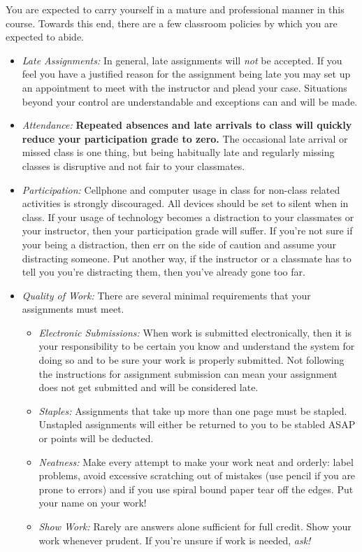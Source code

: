 \documentclass[10pt]{article}
\begin{document}
You are expected to carry yourself in a mature and professional manner in this course. Towards this end, there are a few classroom policies by which you are expected to abide.
\begin{itemize}

\item \textit{Late Assignments: } In general, late assignments will \textit{not} be accepted.  If you feel you have a justified reason for the assignment being late you may set up an appointment to meet with the instructor and plead your case.  Situations beyond your control are understandable and exceptions can and will be made.

\item \textit{Attendance: } \textbf{Repeated absences and late arrivals to class will quickly reduce your participation grade to zero.}  The occasional late arrival or missed class is one thing, but being habitually late and regularly missing classes is disruptive and not fair to your classmates.

\item \textit{Participation: }  Cellphone and computer usage in class for non-class related activities is strongly discouraged.  All devices should be set to silent when in class.  If your usage of technology becomes a distraction to your classmates or your instructor, then your participation grade will suffer.  If you're not sure if your being a distraction, then err on the side of caution and assume your distracting someone.  Put another way, if the instructor or a classmate has to tell you you're distracting them, then you've already gone too far.

\item \textit{Quality of Work:} There are several minimal requirements that your assignments must meet.
\begin{itemize}
\item \textit{Electronic Submissions:}  When work is submitted electronically, then it is your responsibility to be certain you know and understand the system for doing so and to be sure your work is properly submitted. Not following the instructions for assignment submission can mean your assignment does not get submitted and will be considered late.

\item \textit{Staples:} Assignments that take up more than one page must be stapled.  Unstapled assignments will either be returned to you to be stabled ASAP or points will be deducted.

\item \textit{Neatness:}  Make every attempt to make your work neat and orderly:  label problems, avoid excessive scratching out of mistakes (use pencil if you are prone to errors) and if you use spiral bound paper tear off the edges. Put your name on your work!

\item \textit{Show Work:} Rarely are answers alone sufficient for full credit.  Show your work whenever prudent.  If you're unsure if work is needed, \textit{ask!}
\end{itemize}

\end{itemize}
\end{document}
